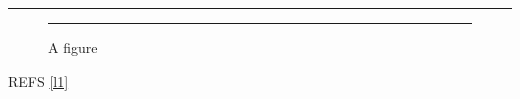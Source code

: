 \documentclass{article}
\begin{document}
\listoflistings
\begin{listing}[h]\centering\rule{2cm}{1cm}\caption{A listing}\label{l1}\end{listing}
\begin{figure}[h]\centering\rule{2cm}{1cm}\caption{A figure}\end{figure}
REFS \ref{l1}
\end{document}
